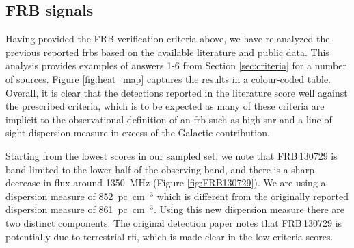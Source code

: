 \documentclass[a4paper,fleqn,usenatbib]{mnras}
\begin{document}
\subsection{FRB signals}
\label{sec:frb_signals}

Having provided the FRB verification criteria above, we have re-analyzed the
previous reported \glspl{frb} based on the available literature and public data.
This analysis provides examples of answers 1-6 from Section \ref{sec:criteria}
for a number of sources. Figure \ref{fig:heat_map} captures the results in a
colour-coded table.  Overall, it is clear that the detections reported in the
literature score well against the prescribed criteria, which is to be expected
as many of these criteria are implicit to the observational definition of an
\gls{frb} such as high \gls{snr} and a line of sight dispersion measure in
excess of the Galactic contribution.

Starting from the lowest scores in our sampled set, we note that FRB\,130729 is
band-limited to the lower half of the observing band, and there is a sharp
decrease in flux around 1350~MHz (Figure \ref{fig:FRB130729}). We are using a
dispersion measure of 852~pc~cm$^{-3}$ which is different from the originally
reported dispersion measure of 861~pc~cm$^{-3}$. Using this new dispersion
measure there are two distinct components. The original detection paper
\citep{2016MNRAS.460L..30C} notes that FRB\,130729 is potentially due to
terrestrial \gls{rfi}, which is made clear in the low criteria scores.
\end{document}

